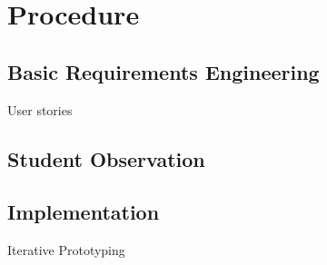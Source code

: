 \section{Procedure}

\subsection{Basic Requirements Engineering}
User stories

\subsection{Student Observation}

\subsection{Implementation}
Iterative Prototyping
